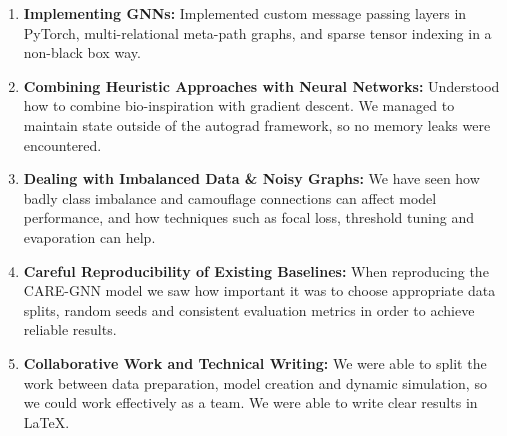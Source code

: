\begin{enumerate}
    \item \textbf{Implementing GNNs:} Implemented custom message passing layers in PyTorch, multi-relational meta-path graphs, and sparse tensor indexing in a non-black box way.
    \item \textbf{Combining Heuristic Approaches with Neural Networks:} Understood how to combine bio-inspiration with gradient descent. We managed to maintain state outside of the autograd framework, so no memory leaks were encountered.
    \item \textbf{Dealing with Imbalanced Data \& Noisy Graphs:} We have seen how badly class imbalance and camouflage connections can affect model performance, and how techniques such as focal loss, threshold tuning and evaporation can help.
    \item \textbf{Careful Reproducibility of Existing Baselines:} When reproducing the CARE-GNN model we saw how important it was to choose appropriate data splits, random seeds and consistent evaluation metrics in order to achieve reliable results.
    \item \textbf{Collaborative Work and Technical Writing:} We were able to split the work between data preparation, model creation and dynamic simulation, so we could work effectively as a team. We were able to write clear results in \LaTeX.
\end{enumerate}
